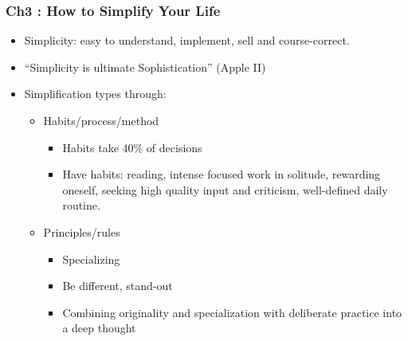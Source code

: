 \begin{frame}[fragile]\frametitle{Ch3 : How to Simplify Your Life}

\begin{itemize}
\item Simplicity: easy to understand, implement, sell and course-correct.
\item ``Simplicity is ultimate Sophistication'' (Apple II)
\item Simplification types through:
	\begin{itemize}
	\item Habits/process/method
		\begin{itemize}
		\item Habits take 40\% of decisions
		\item Have habits: reading, intense focused work in solitude, rewarding oneself, seeking high quality input and criticism, well-defined daily routine.
		\end{itemize}	
	\item Principles/rules
		\begin{itemize}
		\item Specializing
		\item Be different, stand-out
		\item Combining originality and specialization with deliberate practice into a deep thought
		\end{itemize}		
	\end{itemize}
\end{itemize}

\end{frame}

